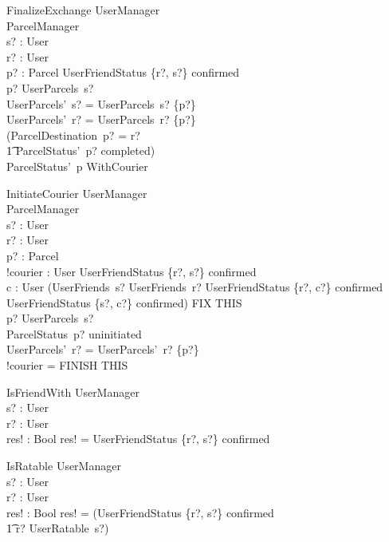 \documentclass{article}
\begin{document}
\begin{schema}{FinalizeExchange}
	\Delta UserManager\\
	\Delta ParcelManager\\
	s? : User\\
	r? : User\\
	p? : Parcel
	\where
	UserFriendStatus \{r?, s?\} \mapsto confirmed\\
	p? \in UserParcels~s?\\
	UserParcels'~s? = UserParcels~s? \setminus \{p?\}\\
	UserParcels'~r? = UserParcels~r? \cup \{p?\}\\
	(ParcelDestination~p? = r? \\
	\t1 \land ParcelStatus'~p? \mapsto completed)\\
	\lor ParcelStatus'~p \mapsto WithCourier\\
\end{schema}

\begin{schema}{InitiateCourier}
	\Delta UserManager\\
	\Delta ParcelManager\\
	s? : User\\
	r? : User\\
	p? : Parcel\\
	!courier : User
	\where
	UserFriendStatus \{r?, s?\} \mapsto confirmed\\
	\exists c : User \in (UserFriends~s? \cap UserFriends~r? \land UserFriendStatus \{r?, c?\} \mapsto confirmed \land UserFriendStatus \{s?, c?\} \mapsto confirmed) FIX THIS\\
	p? \in UserParcels~s?\\
	ParcelStatus~p? \mapsto uninitiated\\
	UserParcels'~r? = UserParcels'~r? \cup \{p?\}\\
	
	!courier = FINISH THIS
\end{schema}

\begin{schema}{IsFriendWith}
	\Delta UserManager\\
	s? : User\\
	r? : User\\
	res! : Bool
	\where
	res! = UserFriendStatus \{r?, s?\} \mapsto confirmed\\
\end{schema}

\begin{schema}{IsRatable}
	\Delta UserManager\\
	s? : User\\
	r? : User\\
	res! : Bool
	\where
	res! = (UserFriendStatus \{r?, s?\} \mapsto confirmed \land\\
	\t1 r? \inbag UserRatable~s?)
\end{schema}
\end{document}
